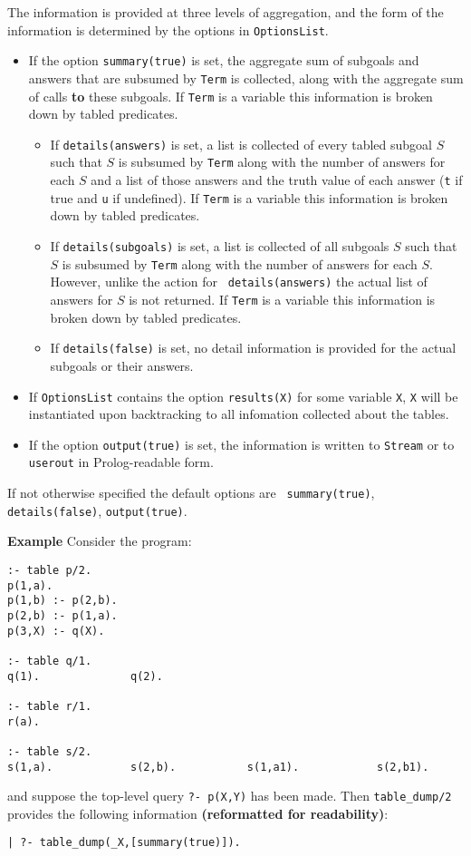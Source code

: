 \begin{description}
The information is provided at three levels of aggregation, and the form
of the information is determined by the options in {\tt OptionsList}.
%
\begin{itemize}
\item If the option {\tt summary(true)} is set, the aggregate sum
  of subgoals and answers that are subsumed by {\tt Term} is
  collected, along with the aggregate sum of calls {\bf to} these
  subgoals.  If {\tt Term} is a variable this information is broken
  down by tabled predicates.
%
\begin{itemize}
\item If {\tt details(answers)} is set, a list is collected of every
  tabled subgoal $S$ such that $S$ is subsumed by {\tt Term} along
  with the number of answers for each $S$ and a list of those answers
  and the truth value of each answer ({\tt t} if true and {\tt u} if
  undefined).  If {\tt Term} is a variable this information is broken
  down by tabled predicates.
%
\item If {\tt details(subgoals)} is set, a list is collected of all
  subgoals $S$ such that $S$ is subsumed by {\tt Term} along with the
  number of answers for each $S$.  However, unlike the action for {\tt
    details(answers)} the actual list of answers for $S$ is not
  returned.  If {\tt Term} is a variable this information is broken
  down by tabled predicates.
%
\item If {\tt details(false)} is set, no detail information is
  provided for the actual subgoals or their answers.
\end{itemize}
%
\item If {\tt OptionsList} contains the option {\tt results(X)} for
  some variable {\tt X}, {\tt X} will be instantiated upon
  backtracking to all infomation collected about the tables.
%
\item If the option {\tt output(true)} is set, the information is
  written to {\tt Stream} or to {\tt userout} in Prolog-readable form.
\end{itemize}
%
If not otherwise specified the default options are {\tt
  summary(true)}, {\tt details(false)}, {\tt output(true)}.

{\bf Example}  Consider the program:
\begin{verbatim}
:- table p/2.
p(1,a).
p(1,b) :- p(2,b).
p(2,b) :- p(1,a).
p(3,X) :- q(X).

:- table q/1.
q(1).              q(2).

:- table r/1.
r(a).

:- table s/2.
s(1,a).            s(2,b).           s(1,a1).            s(2,b1).
\end{verbatim}
and suppose the top-level query {\tt ?- p(X,Y)} has been made.  Then
{\tt table\_dump/2} provides the following information {\bf
 (reformatted for readability)}:
%
{\small
\begin{verbatim}
| ?- table_dump(_X,[summary(true)]).


\end{verbatim}}
\end{description}
